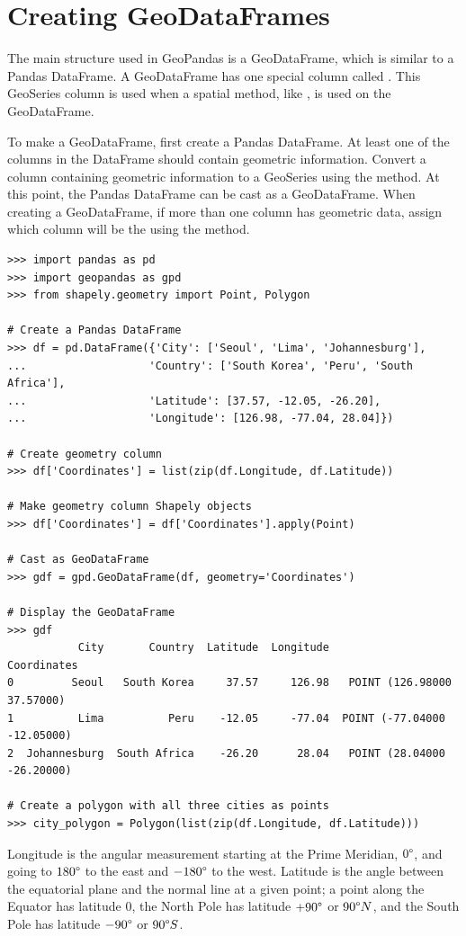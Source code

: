 \section*{Creating GeoDataFrames} %

The main structure used in GeoPandas is a GeoDataFrame, which is similar to a Pandas DataFrame.
A GeoDataFrame has one special column called .
This GeoSeries column is used when a spatial method, like , is used on the GeoDataFrame.

To make a GeoDataFrame, first create a Pandas DataFrame.
At least one of the columns in the DataFrame should contain geometric information.
Convert a column containing geometric information to a GeoSeries using the  method.
At this point, the Pandas DataFrame can be cast as a GeoDataFrame.
When creating a GeoDataFrame, if more than one column has geometric data, assign which column will be the  using the  method.

\begin{lstlisting}
>>> import pandas as pd
>>> import geopandas as gpd
>>> from shapely.geometry import Point, Polygon

# Create a Pandas DataFrame
>>> df = pd.DataFrame({'City': ['Seoul', 'Lima', 'Johannesburg'],
...                   'Country': ['South Korea', 'Peru', 'South Africa'],
...                   'Latitude': [37.57, -12.05, -26.20],
...                   'Longitude': [126.98, -77.04, 28.04]})

# Create geometry column
>>> df['Coordinates'] = list(zip(df.Longitude, df.Latitude))

# Make geometry column Shapely objects
>>> df['Coordinates'] = df['Coordinates'].apply(Point)

# Cast as GeoDataFrame
>>> gdf = gpd.GeoDataFrame(df, geometry='Coordinates')

# Display the GeoDataFrame
>>> gdf
           City       Country  Latitude  Longitude                  Coordinates
0         Seoul   South Korea     37.57     126.98   POINT (126.98000 37.57000)
1          Lima          Peru    -12.05     -77.04  POINT (-77.04000 -12.05000)
2  Johannesburg  South Africa    -26.20      28.04   POINT (28.04000 -26.20000)

# Create a polygon with all three cities as points
>>> city_polygon = Polygon(list(zip(df.Longitude, df.Latitude)))
\end{lstlisting}


\begin{info}
Longitude is the angular measurement starting at the Prime Meridian, $0\degree$, and going to $180\degree$ to the east and $-180\degree$ to the west.
Latitude is the angle between the equatorial plane and the normal line at a given point; a point along the Equator has latitude $0$, the North Pole has latitude $+90\degree$ or $90\degree N$, and the South Pole has latitude $-90\degree$ or $90\degree S$.
\end{info}

